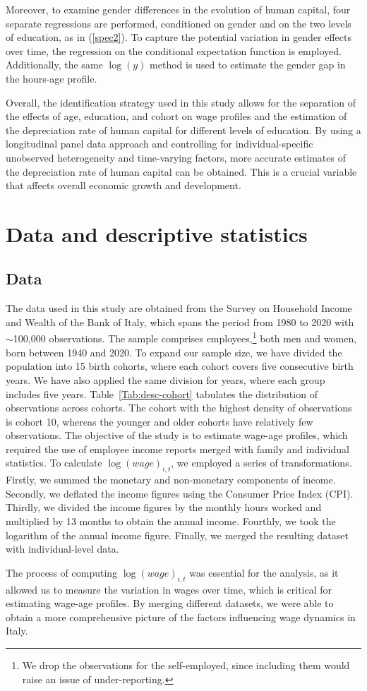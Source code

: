 \documentclass[12pt]{article}
\begin{document}
Moreover, to examine gender differences in the evolution of human capital, four separate regressions are performed,
conditioned on gender and on the two levels of education, as in (\ref{spec2}). To capture the potential variation in gender
effects over time, the
regression on the conditional expectation function is employed. Additionally, the same $\log(y)$ method is used to
estimate the gender gap in the hours-age profile.
\par
Overall, the identification strategy used in this study allows for the separation of the effects of age, education, and
cohort on wage profiles and the estimation of the depreciation rate of human capital for different levels of education.
By using a longitudinal panel data approach and controlling for individual-specific unobserved heterogeneity and
time-varying factors, more accurate estimates of the depreciation rate of human capital can be obtained. This is a
crucial variable that affects overall economic growth and development.

\section{Data and descriptive statistics}
\subsection{Data}
The data used in this study are obtained from the Survey on Household Income and Wealth of the Bank of Italy, which
spans the period from 1980 to 2020 with $\sim$100,000 observations. The sample comprises employees,\footnote{We drop the
observations for the self-employed, since including them would raise an issue of under-reporting.} both men and women,
born between 1940 and 2020. To expand our sample size, we have divided the population into 15 birth cohorts, where each
cohort covers five consecutive birth years. We have also applied the same division for years, where each group includes
five years. Table~\ref{Tab:desc-cohort} tabulates the distribution of observations across cohorts. The cohort with the
highest density of observations is cohort 10, whereas the younger and older cohorts have relatively few observations.
The objective of the study is to estimate wage-age profiles, which required the use of employee income reports merged
with family and individual statistics. To calculate $\log(wage)_{i,t}$, we employed a series of transformations. Firstly, we summed the
monetary and non-monetary components of income. Secondly, we deflated the income figures using the Consumer Price Index
(CPI). Thirdly, we divided the income figures by the monthly hours worked and multiplied by 13 months to obtain the
annual income. Fourthly, we took the logarithm of the annual income figure. Finally, we merged the resulting dataset
with individual-level data.
\par
The process of computing $\log(wage)_{i,t}$ was essential for the analysis, as it allowed us to measure the variation
in wages over time, which is critical for estimating wage-age profiles. By merging different datasets, we were able to
obtain a more comprehensive picture of the factors influencing wage dynamics in Italy. 
\end{document}
